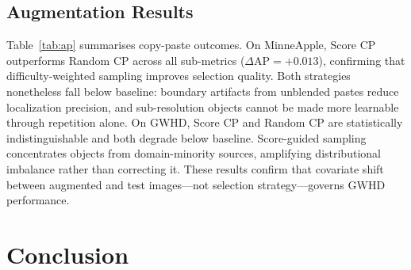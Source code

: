 \documentclass[conference]{IEEEtran}
\begin{document}
\subsection{Augmentation Results}

Table~\ref{tab:ap} summarises copy-paste outcomes. On MinneApple,
Score CP outperforms Random CP across all sub-metrics
($\Delta\mathrm{AP}{=}{+}0.013$), confirming that difficulty-weighted
sampling improves selection quality. Both strategies nonetheless fall
below baseline: boundary artifacts from unblended pastes reduce
localization precision, and sub-resolution objects cannot be made more
learnable through repetition alone. On GWHD, Score CP and Random CP
are statistically indistinguishable and both degrade below baseline.
Score-guided sampling concentrates objects from domain-minority
sources, amplifying distributional imbalance rather than correcting
it. These results confirm that covariate shift between augmented and
test images---not selection strategy---governs GWHD performance.

\begin{table}[t]
\centering
\caption{Copy-paste augmentation results.}
\label{tab:ap}
\end{table}

\section{Conclusion}
\end{document}
